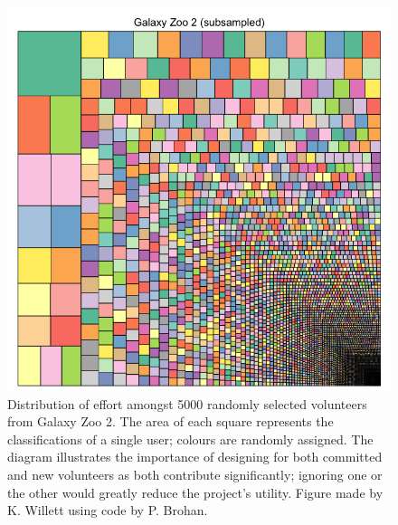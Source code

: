 \documentclass{ar2e}
\begin{document}
\begin{figure}[!ht]
\centering\includegraphics[width=\linewidth]{figs/gz2squares.png}
\caption{Distribution of effort amongst 5000 randomly selected volunteers from
Galaxy Zoo 2. The area of each square represents the classifications of a single
user; colours are randomly assigned. The diagram illustrates the importance of
designing for both committed and new volunteers as both contribute
significantly; ignoring one or the other would greatly reduce the project's utility. Figure made by K. Willett using code
by P. Brohan.}
\label{fig:gz2}
\end{figure}
\end{document}
